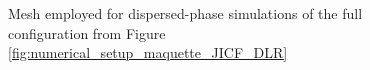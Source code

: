\begin{figure}[h!]
	\centering
	\caption{Mesh employed for dispersed-phase simulations of the full configuration from Figure \ref{fig:numerical_setup_maquette_JICF_DLR}}
	\label{fig:jicf_dlr_mesh_LGS}
\end{figure}


%
%
%
%
%
%	
%	
%	
%	
%	
%	
%	
%	
%	
%

